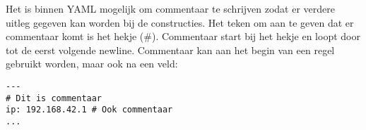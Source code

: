 Het is binnen YAML mogelijk om commentaar te schrijven zodat er verdere uitleg gegeven kan worden bij de constructies. Het teken om aan te geven dat er commentaar komt is het hekje (\#). Commentaar start bij het hekje en loopt door tot de eerst volgende newline. Commentaar kan aan het begin van een regel gebruikt worden, maar ook na een veld:
\begin{verbatim}
---
# Dit is commentaar
ip: 192.168.42.1 # Ook commentaar
...
\end{verbatim}

